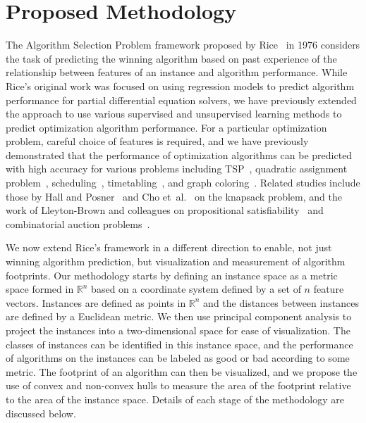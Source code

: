 \documentclass[conference]{IEEEtran}
\begin{document}
\section{Proposed Methodology} \label{sec:Methodology}
The Algorithm Selection Problem framework proposed by Rice~\cite{Rice} in 1976 considers the task of predicting the winning algorithm based on past experience of the relationship between features of an instance and algorithm performance. While Rice's original work was focused on using regression models to predict algorithm performance for partial differential equation solvers, we have previously extended the approach to use various supervised and unsupervised learning methods to predict optimization algorithm performance. For a particular optimization problem, careful choice of features is required, and we have previously demonstrated that the performance of optimization algorithms can be predicted with high accuracy for various problems including TSP~\cite{AMAI}, quadratic assignment problem~\cite{IJCNN}, scheduling~\cite{LNCS}, timetabling~\cite{LION}, and graph coloring~\cite{HybridMetaheuristics}. Related studies include those by Hall and Posner~\cite{PerformancePrediction} and Cho et~al.~\cite{KnapsackHeuristics} on the knapsack problem, and the work of Lleyton-Brown and colleagues on propositional satisfiability~\cite{SATzilla} and combinatorial auction problems~\cite{EmpiricalHardness}.

We now extend Rice's framework in a different direction to enable, not just winning algorithm prediction, but visualization and measurement of algorithm footprints. Our methodology starts by defining an instance space as a metric space formed in $\mathbb{R}^n$ based on a coordinate system defined by a set of $n$ feature vectors. Instances are defined as points in $\mathbb{R}^n$ and the distances between instances are defined by a Euclidean metric. We then use principal component analysis to project the instances into a two-dimensional space for ease of visualization. The classes of instances can be identified in this instance space, and the performance of algorithms on the instances can be labeled as good or bad according to some metric. The footprint of an algorithm can then be visualized, and we propose the use of convex and non-convex hulls to measure the area of the footprint relative to the area of the instance space. Details of each stage of the methodology are discussed below.
\end{document}
